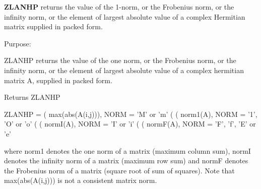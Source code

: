 {\bfseries Z\+L\+A\+N\+H\+P} returns the value of the 1-\/norm, or the Frobenius norm, or the infinity norm, or the element of largest absolute value of a complex Hermitian matrix supplied in packed form. 

 \begin{DoxyParagraph}{Purpose\+: }
\begin{DoxyVerb} ZLANHP  returns the value of the one norm,  or the Frobenius norm, or
 the  infinity norm,  or the  element of  largest absolute value  of a
 complex hermitian matrix A,  supplied in packed form.\end{DoxyVerb}

\end{DoxyParagraph}
\begin{DoxyReturn}{Returns}
Z\+L\+A\+N\+H\+P \begin{DoxyVerb}    ZLANHP = ( max(abs(A(i,j))), NORM = 'M' or 'm'
             (
             ( norm1(A),         NORM = '1', 'O' or 'o'
             (
             ( normI(A),         NORM = 'I' or 'i'
             (
             ( normF(A),         NORM = 'F', 'f', 'E' or 'e'

 where  norm1  denotes the  one norm of a matrix (maximum column sum),
 normI  denotes the  infinity norm  of a matrix  (maximum row sum) and
 normF  denotes the  Frobenius norm of a matrix (square root of sum of
 squares).  Note that  max(abs(A(i,j)))  is not a consistent matrix norm.\end{DoxyVerb}
 
\end{DoxyReturn}

